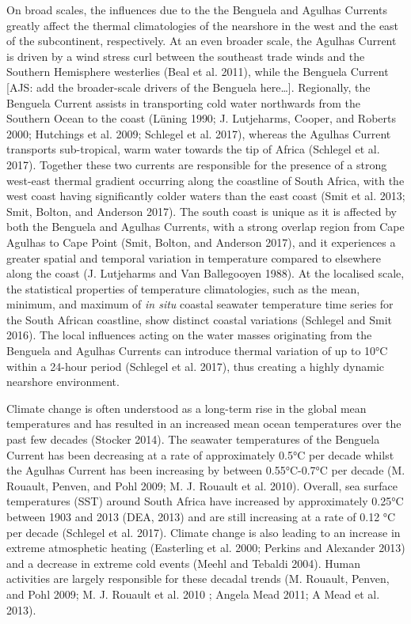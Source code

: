 \documentclass[12pt,A4paper,]{article}
\begin{document}
On broad scales, the influences due to the the Benguela and Agulhas
Currents greatly affect the thermal climatologies of the nearshore in
the west and the east of the subcontinent, respectively. At an even
broader scale, the Agulhas Current is driven by a wind stress curl
between the southeast trade winds and the Southern Hemisphere westerlies
(Beal et al. 2011), while the Benguela Current {[}AJS: add the
broader-scale drivers of the Benguela here\ldots{}{]}. Regionally, the
Benguela Current assists in transporting cold water northwards from the
Southern Ocean to the coast (Lüning 1990; J. Lutjeharms, Cooper, and
Roberts 2000; Hutchings et al. 2009; Schlegel et al. 2017), whereas the
Agulhas Current transports sub-tropical, warm water towards the tip of
Africa (Schlegel et al. 2017). Together these two currents are
responsible for the presence of a strong west-east thermal gradient
occurring along the coastline of South Africa, with the west coast
having significantly colder waters than the east coast (Smit et al.
2013; Smit, Bolton, and Anderson 2017). The south coast is unique as it
is affected by both the Benguela and Agulhas Currents, with a strong
overlap region from Cape Agulhas to Cape Point (Smit, Bolton, and
Anderson 2017), and it experiences a greater spatial and temporal
variation in temperature compared to elsewhere along the coast (J.
Lutjeharms and Van Ballegooyen 1988). At the localised scale, the
statistical properties of temperature climatologies, such as the mean,
minimum, and maximum of \emph{in situ} coastal seawater temperature time
series for the South African coastline, show distinct coastal variations
(Schlegel and Smit 2016). The local influences acting on the water
masses originating from the Benguela and Agulhas Currents can introduce
thermal variation of up to 10°C within a 24-hour period (Schlegel et al.
2017), thus creating a highly dynamic nearshore environment.

Climate change is often understood as a long-term rise in the global
mean temperatures and has resulted in an increased mean ocean
temperatures over the past few decades (Stocker 2014). The seawater
temperatures of the Benguela Current has been decreasing at a rate of
approximately 0.5°C per decade whilst the Agulhas Current has been
increasing by between 0.55°C-0.7°C per decade (M. Rouault, Penven, and
Pohl 2009; M. J. Rouault et al. 2010). Overall, sea surface temperatures
(SST) around South Africa have increased by approximately 0.25°C between
1903 and 2013 (DEA, 2013) and are still increasing at a rate of 0.12 °C
per decade (Schlegel et al. 2017). Climate change is also leading to an
increase in extreme atmosphetic heating (Easterling et al. 2000; Perkins
and Alexander 2013) and a decrease in extreme cold events (Meehl and
Tebaldi 2004). Human activities are largely responsible for these
decadal trends (M. Rouault, Penven, and Pohl 2009; M. J. Rouault et al.
2010 ; Angela Mead 2011; A Mead et al. 2013).
\end{document}
